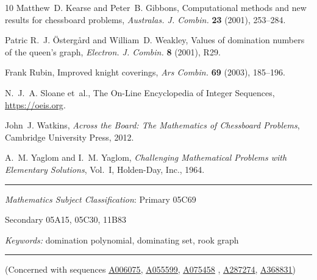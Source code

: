 \documentclass[12pt,reqno]{article}
\newcommand{\seqnum}[1]{\href{https://oeis.org/#1}{\rm \underline{#1}}}
\begin{document}
\begin{thebibliography}{10}
Matthew~D. Kearse and Peter~B. Gibbons, Computational methods and new results
  for chessboard problems, {\em Australas. J. Combin.} {\bf 23}
  (2001), 253--284.

Patric R.~J. {\"{O}}sterg{\aa}rd and William~D. Weakley, {Values of domination
  numbers of the queen's graph}, {\em Electron. J. Combin.}
  {\bf 8} (2001), R29.

Frank Rubin, {Improved knight coverings}, {\em Ars Combin.} {\bf 69}
  (2003), 185--196.

N.~J.~A. Sloane et~al., The {O}n-{L}ine {E}ncyclopedia of {I}nteger
  {S}equences, \url{https://oeis.org}.

John~J. Watkins, {\em {Across the Board: The Mathematics of Chessboard
  Problems}}, Cambridge University Press, 2012.

A.~M. Yaglom and I.~M. Yaglom, {\em {Challenging Mathematical Problems with
  Elementary Solutions}}, Vol.~I, Holden-Day, Inc., 1964.

\end{thebibliography}





\bigskip
\hrule
\bigskip

 {\it Mathematics Subject Classification}:
Primary
  05C69   %
  
Secondary
  05A15,  %
  05C30,  %
  11B83   %
 
\noindent \emph{Keywords:}
domination polynomial, dominating set, rook graph

\bigskip
\hrule
\bigskip

\noindent (Concerned with sequences \seqnum{A006075},
\seqnum{A055599}, \seqnum{A075458} , \seqnum{A287274}, \seqnum{A368831})
\end{document}
